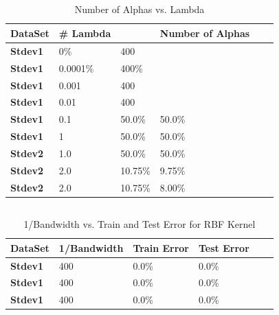 \documentclass[pageno]{jpaper}
\begin{document}
\subsection{}
\begin{table}[h!]
  \centering
  \begin{tabular}{llllll|}
    \hline
     \textbf{DataSet} &\textbf{\# Lambda}  & & \textbf{Number of Alphas} \\
    \hline
    \hline

  \textbf{Stdev1} 	 & 0\%  &400\\
 \hline
  \textbf{Stdev1} 	 &0.0001\% &400\%  \\
 \hline
  \textbf{Stdev1} 	&0.001 &400  \\
 \hline
   \textbf{Stdev1} 	&0.01 &400  \\
 \hline
  \textbf{Stdev1} 	&0.1 &50.0\% & 50.0\%  \\
 \hline
  \textbf{Stdev1} 	&1 &50.0\% &50.0\%  \\
 \hline
  \textbf{Stdev2} 	&1.0 &50.0\% &50.0\%  \\
 \hline
  \textbf{Stdev2} 	&2.0 &10.75\% &9.75\%  \\
   \hline
  \textbf{Stdev2} 	&2.0 &10.75\% &8.00\%  \\
  
 \hline
 \end{tabular}
  \caption{Number of Alphas vs. Lambda}
  \label{table:formatting}
\end{table}

\subsection{}
\begin{table}[h!]
  \centering
  \begin{tabular}{llllll|}
    \hline
     \textbf{DataSet}  & \textbf{1/Bandwidth} &\textbf{Train Error} & \textbf{Test Error}\\
    \hline
    \hline
 \textbf{Stdev1} 	   &400 &0.0\% & 0.0\%\\
 \hline
  \textbf{Stdev1} 	   &400 &0.0\% & 0.0\%\\
 \hline
  \textbf{Stdev1} 	   &400 &0.0\% & 0.0\%\\
 \hline

  \end{tabular}
  \caption{1/Bandwidth vs. Train and Test Error for RBF Kernel}
  \label{table:formatting}
\end{table}
\end{document}
